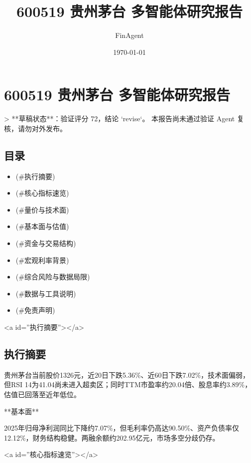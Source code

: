\documentclass[12pt,a4paper]{article}
\title{600519 贵州茅台 多智能体研究报告}
\author{FinAgent}
\date{\today}
\begin{document}
\maketitle
\tableofcontents
\newpage
\sloppy
\section{600519 贵州茅台 多智能体研究报告}

> **草稿状态**：验证评分 72，结论 `revise`。 本报告尚未通过验证 Agent 复核，请勿对外发布。

\subsection{ 目录}

\begin{itemize}
\item [执行摘要](\#执行摘要)
\item [核心指标速览](\#核心指标速览)
\item [量价与技术面](\#量价与技术面)
\item [基本面与估值](\#基本面与估值)
\item [资金与交易结构](\#资金与交易结构)
\item [宏观利率背景](\#宏观利率背景)
\item [综合风险与数据局限](\#综合风险与数据局限)
\item [数据与工具说明](\#数据与工具说明)
\item [免责声明](\#免责声明)
\end{itemize}

<a id=''执行摘要''></a>

\subsection{ 执行摘要}
贵州茅台当前股价1326元，近20日下跌5.36\%、近60日下跌7.02\%，技术面偏弱，但RSI 14为41.04尚未进入超卖区；同时TTM市盈率约20.04倍、股息率约3.89\%，估值已回落至近年低位。

**基本面**

2025年归母净利润同比下降约7.07\%，但毛利率仍高达90.50\%、资产负债率仅12.12\%，财务结构稳健。两融余额约202.95亿元，市场多空分歧仍存。

<a id=''核心指标速览''></a>
\end{document}
